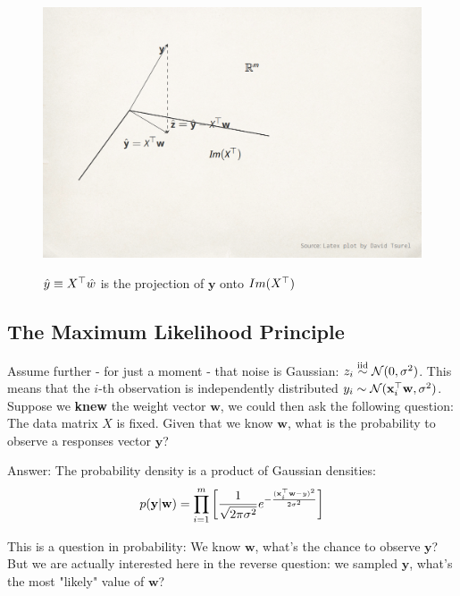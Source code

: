 \begin{figure}[h!]
  \centering
    \includegraphics[width=5.5in]{Geometry2.png} \\
 \caption{$\hat{y}\equiv X^{\top} \hat{w}$ is the projection of $\mathbf{y}$ onto $Im(X^{\top})$}
\end{figure}





\subsection{The Maximum Likelihood Principle}
 Assume further - for just a moment - that noise is Gaussian: $z_i\stackrel{\text{iid}}{\sim}\mathcal{N}(0,\sigma^2)$. This means that the $i$-th observation is independently distributed $y_i\sim \mathcal{N}(\mathbf{x}_i^{\top} \mathbf{w},\sigma^2)$.
Suppose we {\bf knew} the weight vector $\mathbf{w}$, we could then ask the following question: The data matrix $X$ is fixed. Given that we know
          $\mathbf{w}$, what is the probability to observe a responses vector $\mathbf{y}$?

Answer: The probability density is a product of Gaussian densities:
          \[p(\mathbf{y}|\mathbf{w}) = \prod_{i=1}^m \left[ \frac{1}{\sqrt{2\pi
            \sigma^2}} e^{-\frac{(\mathbf{x}_i^{\top} \mathbf{w}-y)^2}{2\sigma^2}}\right]
          \]

This is a question in probability: We know $\mathbf{w}$, what's the chance to observe $\mathbf{y}$? But we are actually interested here in the reverse question: we sampled
$\mathbf{y}$, what's the most "likely" value of $\mathbf{w}$?

